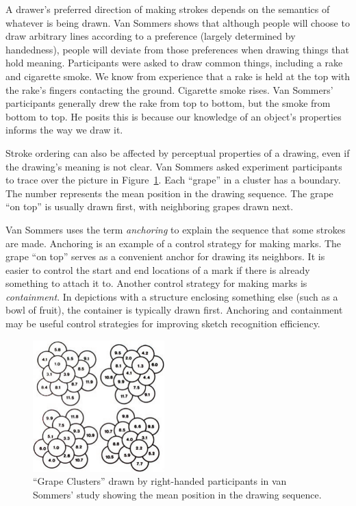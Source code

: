 A drawer's preferred direction of making strokes depends on the
semantics of whatever is being drawn. Van Sommers shows that although
people will choose to draw arbitrary lines according to a preference
(largely determined by handedness), people will deviate from those
preferences when drawing things that hold meaning. Participants were
asked to draw common things, including a rake and cigarette smoke. We
know from experience that a rake is held at the top with the rake's
fingers contacting the ground. Cigarette smoke rises. Van Sommers'
participants generally drew the rake from top to bottom, but the smoke
from bottom to top. He posits this is because our knowledge of an
object's properties informs the way we draw it.

Stroke ordering can also be affected by perceptual properties of a
drawing, even if the drawing's meaning is not clear.  Van Sommers
asked experiment participants to trace over the picture in
Figure~\ref{fig:grape-clusters}. Each ``grape'' in a cluster has a
boundary. The number represents the mean position in the drawing
sequence. The grape ``on top'' is usually drawn first, with
neighboring grapes drawn next.

Van Sommers uses the term \textit{anchoring} to explain the sequence
that some strokes are made. Anchoring is an example of a control
strategy for making marks. The grape ``on top'' serves as a convenient
anchor for drawing its neighbors. It is easier to control the start
and end locations of a mark if there is already something to attach it
to. Another control strategy for making marks
is \textit{containment}. In depictions with a structure enclosing
something else (such as a bowl of fruit), the container is typically
drawn first. Anchoring and containment may be useful control
strategies for improving sketch recognition efficiency.

\begin{figure}
  \begin{center}
  \includegraphics[width=2in]{img/van-sommers-grapes.pdf}
  \caption{``Grape Clusters'' drawn by right-handed participants in
    van Sommers' study showing the mean position in the drawing
    sequence.}
  \label{fig:grape-clusters} 
  \end{center}
\end{figure}

